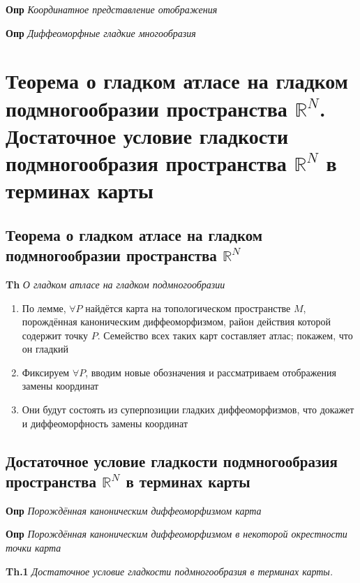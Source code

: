 \documentclass[a4paper, 14pt]{article}
\begin{document}
    \textbf{Опр} \textit{Координатное представление отображения}
    
    \textbf{Опр} \textit{Диффеоморфные гладкие многообразия}
    
    \section{Теорема о гладком атласе на гладком подмногообразии пространства $\mathbb{R}^N$.
    Достаточное условие гладкости подмногообразия пространства $\mathbb{R}^N$ в терминах карты}
    
    \subsection{Теорема о гладком атласе на гладком подмногообразии пространства $\mathbb{R}^N$}
    
    \textbf{Th} \textit{О гладком атласе на гладком подмногообразии}
    
    \begin{enumerate}
        \item По лемме, $\forall P$ найдётся карта на топологическом пространстве $M$, порождённая каноническим
        диффеоморфизмом, район действия которой содержит точку $P$.
        Семейство всех таких карт составляет атлас; покажем, что он гладкий
        \item Фиксируем $\forall P$, вводим новые обозначения и рассматриваем отображения замены координат
        \item Они будут состоять из суперпозиции гладких диффеоморфизмов, что докажет и диффеоморфность замены координат
    \end{enumerate}
    
    \subsection{Достаточное условие гладкости подмногообразия пространства $\mathbb{R}^N$ в терминах карты}
    
    \textbf{Опр} \textit{Порождённая каноническим диффеоморфизмом карта}
    
    \textbf{Опр} \textit{Порождённая каноническим диффеоморфизмом в некоторой окрестности точки карта}
    
    \textbf{Th.1} \textit{Достаточное условие гладкости подмногообразия в терминах карты.}
    
\end{document}
